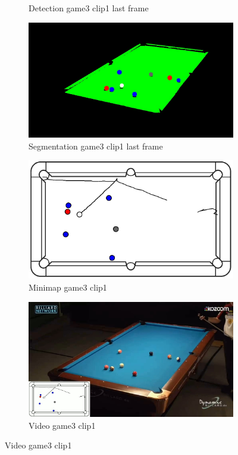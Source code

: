 \begin{figure}[H]
\begin{subfigure}[b]{0.48\textwidth}
		\caption{Detection game3 clip1 last frame}
		\label{fig: game3_clip1_last_frame_detected}
	\end{subfigure}
	\begin{subfigure}[b]{0.48\textwidth}
		\centering
		\includegraphics[width=\textwidth]{images/Segmentation/game3_clip1_segmented_balls_last_frame.jpg}
		\caption{Segmentation game3 clip1 last frame}
		\label{fig: game3_clip1_last_frame_segmented}
	\end{subfigure}
	\begin{subfigure}[b]{0.48\textwidth}
		\centering
		\includegraphics[width=\textwidth]{images/AllMinimap/game3_clip1_minimap.png}
		\caption{Minimap game3 clip1}
		\label{fig: game3_clip1_minimap}
	\end{subfigure}
	\begin{subfigure}[b]{0.48\textwidth}
		\centering
		\includegraphics[width=\textwidth]{images/Video/game3_clip1_video.jpg}
		\caption{Video game3 clip1}
		\label{fig: game3_clip1_video}
	\end{subfigure}


\end{figure}
